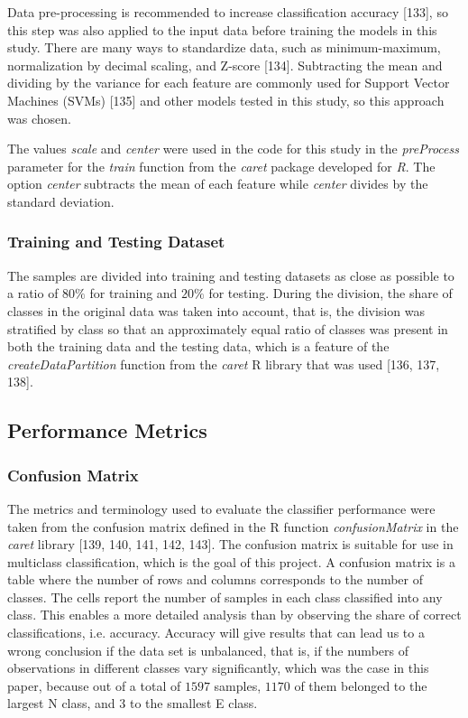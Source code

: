 \documentclass[sn-mathphys-num]{sn-jnl}%
\begin{document}
Data pre-processing is recommended to increase classification accuracy [133], so this step was also applied to the input data before training the models in this study. There are many ways to standardize data, such as minimum-maximum, normalization by decimal scaling, and Z-score [134]. Subtracting the mean and dividing by the variance for each feature are commonly used for Support Vector Machines (SVMs) [135] and other models tested in this study, so this approach was chosen. 

The values \textit{scale} and \textit{center} were used in the code for this study in the \textit{preProcess} parameter for the \textit{train} function from the \textit{caret} package developed for \textit{R}. The option \textit{center} subtracts the mean of each feature while \textit{center} divides by the standard deviation. 

\subsubsection{Training and Testing Dataset}

The samples are divided into training and testing datasets as close as possible to a ratio of $80\%$ for training and $20\%$ for testing. During the division, the share of classes in the original data was taken into account, that is, the division was stratified by class so that an approximately equal ratio of classes was present in both the training data and the testing data, which is a feature of the \textit{createDataPartition} function from the \textit{caret} R library that was used [136, 137, 138].

\subsection{Performance Metrics}

\subsubsection{Confusion Matrix}

The metrics and terminology used to evaluate the classifier performance were taken from the confusion matrix defined in the R function \textit{confusionMatrix} in the \textit{caret} library [139, 140, 141, 142, 143]. The confusion matrix is suitable for use in multiclass classification, which is the goal of this project. A confusion matrix is a table where the number of rows and columns corresponds to the number of classes. The cells report the number of samples in each class classified into any class. This enables a more detailed analysis than by observing the share of correct classifications, i.e. accuracy. Accuracy will give results that can lead us to a wrong conclusion if the data set is unbalanced, that is, if the numbers of observations in different classes vary significantly, which was the case in this paper, because out of a total of $1597$ samples, $1170$ of them belonged to the largest N class, and $3$ to the smallest E class.
\end{document}
